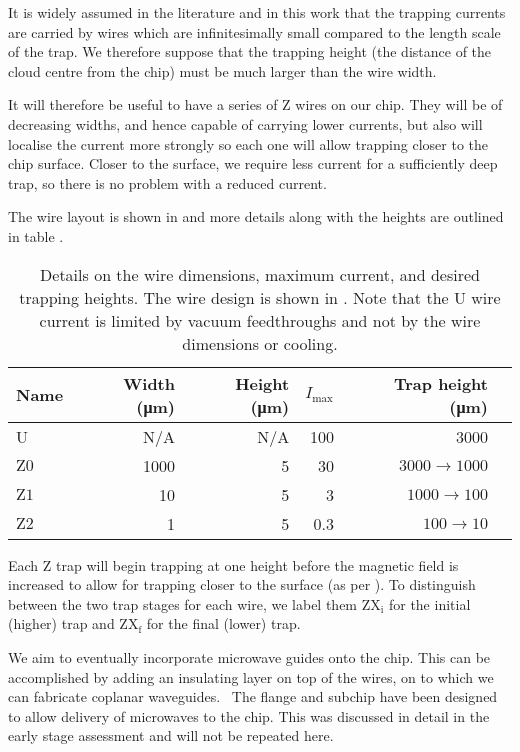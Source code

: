 It is widely assumed in the literature and in this work that the trapping
currents are carried by wires which are infinitesimally small compared to the
length scale of the trap. We therefore suppose that the trapping height (the
distance of the cloud centre from the chip) must be much larger than the wire
width.

It will therefore be useful to have a series of Z wires on our chip. They will
be of decreasing widths, and hence capable of carrying lower currents, but also
will localise the current more strongly so each one will allow trapping closer
to the chip surface. Closer to the surface, we require less current for a
sufficiently deep trap, so there is no problem with a reduced current.

The wire layout is shown
in  and more details along with the
heights are outlined in table . 

\begin{table}
  \centering
\begin{tabular}{lrrrrr}
  Name & Width (\si{\micro\meter})& Height (\si{\micro\meter})& $I_\text{max}$ & Trap height (\si{\micro\meter}) \\
 \hline
  U & N/A& N/A& 100 & 3000\\
  $\mathrm{Z0}$ & 1000&  5& 30& $3000\rightarrow1000$ \\
  $\mathrm{Z1}$ & 10&  5& 3& $1000\rightarrow100$ \\
  $\mathrm{Z2}$ & 1&  5& 0.3& $100\rightarrow10$ \\
 \hline
\end{tabular}
  \caption{Details on the wire dimensions, maximum current, and desired
  trapping heights. The wire design is shown in
  . Note that the U wire current is
  limited by vacuum feedthroughs and not by the wire dimensions or cooling.
  }
  \label{design:table:wires}
\end{table}

Each Z trap will begin trapping at one height before the magnetic field is
increased to allow for trapping closer to the surface (as per ).
To distinguish between the two trap stages for each wire, we label them
$\mathrm{ZX_i}$ for the initial (higher) trap and $\mathrm{ZX_f}$ for the final
(lower) trap.

We aim to eventually incorporate microwave guides onto the chip. This can be
accomplished by adding an insulating layer on top of the wires, on to which we
can fabricate coplanar waveguides.~\cite{1127105} The flange and subchip have
been designed to allow delivery of microwaves to the chip.  This was discussed in detail in the early stage
assessment and will not be repeated here.

